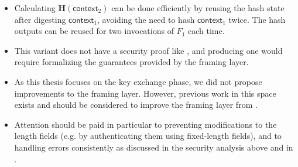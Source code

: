 \begin{itemize}
    \item Calculating $\mathbf{H}(\mathsf{context}_2)$ can be done efficiently by reusing the hash state after digesting $\mathsf{context}_1$, avoiding the need to hash $\mathsf{context}_1$ twice. The hash outputs can be reused for two invocations of $F_1$ each time.
    
    \item This variant does not have a security proof like \drivel{}, and producing one would require formalizing the guarantees provided by the framing layer.

    \item As this thesis focuses on the key exchange phase, we did not propose improvements to the framing layer. However, previous work in this space exists \cite{Fenske2024} and should be considered to improve the framing layer from \obfsfour{}.

    \item Attention should be paid in particular to preventing modifications to the length fields (e.g. by authenticating them using fixed-length fields), and to handling errors consistently as discussed in the security analysis above and in \cite[Section~3.3]{Fenske2024}.

\end{itemize}

